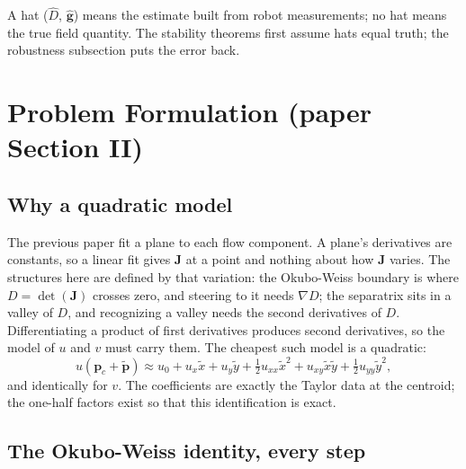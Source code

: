 \documentclass[11pt]{article}
\begin{document}
A hat ($\hat{D}$, $\hat{\mathbf{g}}$) means the estimate built from robot
measurements; no hat means the true field quantity. The stability theorems
first assume hats equal truth; the robustness subsection puts the error back.

\section{Problem Formulation (paper Section II)}

\subsection{Why a quadratic model}

The previous paper fit a plane to each flow component. A plane's derivatives
are constants, so a linear fit gives $\mathbf{J}$ at a point and nothing about
how $\mathbf{J}$ varies. The structures here are defined by that variation:
the Okubo-Weiss boundary is where $D = \det(\mathbf{J})$ crosses zero, and
steering to it needs $\nabla D$; the separatrix sits in a valley of $D$, and
recognizing a valley needs the second derivatives of $D$. Differentiating a
product of first derivatives produces second derivatives, so the model of
$u$ and $v$ must carry them. The cheapest such model is a quadratic:
\begin{equation}
u(\mathbf{p}_c + \tilde{\mathbf{p}}) \approx u_0 + u_x\tilde{x} + u_y\tilde{y}
+ \tfrac{1}{2}u_{xx}\tilde{x}^2 + u_{xy}\tilde{x}\tilde{y}
+ \tfrac{1}{2}u_{yy}\tilde{y}^2,
\end{equation}
and identically for $v$. The coefficients are exactly the Taylor data at the
centroid; the one-half factors exist so that this identification is exact.

\subsection{The Okubo-Weiss identity, every step}
\end{document}
